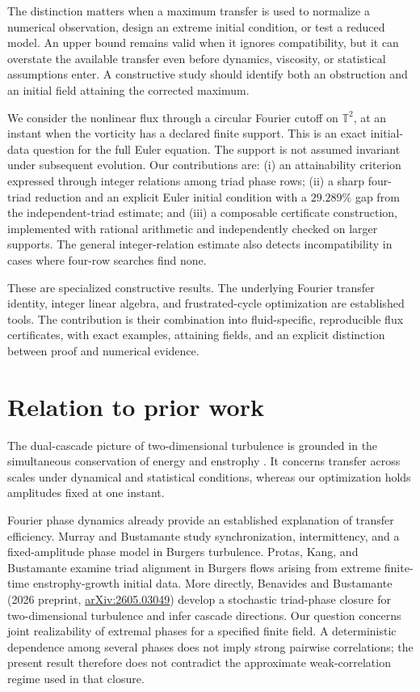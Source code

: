 \documentclass[11pt]{article}
\newcommand{\T}{\mathbb T}\newcommand{\Z}{\mathbb Z}\newcommand{\R}{\mathbb R}
\begin{document}
The distinction matters when a maximum transfer is used to normalize a numerical observation, design an extreme initial condition, or test a reduced model. An upper bound remains valid when it ignores compatibility, but it can overstate the available transfer even before dynamics, viscosity, or statistical assumptions enter. A constructive study should identify both an obstruction and an initial field attaining the corrected maximum.

We consider the nonlinear flux through a circular Fourier cutoff on $\T^2$, at an instant when the vorticity has a declared finite support. This is an exact initial-data question for the full Euler equation. The support is not assumed invariant under subsequent evolution. Our contributions are: (i) an attainability criterion expressed through integer relations among triad phase rows; (ii) a sharp four-triad reduction and an explicit Euler initial condition with a $29.289\%$ gap from the independent-triad estimate; and (iii) a composable certificate construction, implemented with rational arithmetic and independently checked on larger supports. The general integer-relation estimate also detects incompatibility in cases where four-row searches find none.

These are specialized constructive results. The underlying Fourier transfer identity, integer linear algebra, and frustrated-cycle optimization are established tools. The contribution is their combination into fluid-specific, reproducible flux certificates, with exact examples, attaining fields, and an explicit distinction between proof and numerical evidence.

\section{Relation to prior work}
The dual-cascade picture of two-dimensional turbulence is grounded in the simultaneous conservation of energy and enstrophy \cite{kraichnan}. It concerns transfer across scales under dynamical and statistical conditions, whereas our optimization holds amplitudes fixed at one instant.

Fourier phase dynamics already provide an established explanation of transfer efficiency. Murray and Bustamante \cite{murray} study synchronization, intermittency, and a fixed-amplitude phase model in Burgers turbulence. Protas, Kang, and Bustamante \cite{protas} examine triad alignment in Burgers flows arising from extreme finite-time enstrophy-growth initial data. More directly, Benavides and Bustamante (2026 preprint, \href{https://arxiv.org/abs/2605.03049}{arXiv:2605.03049}) develop a stochastic triad-phase closure for two-dimensional turbulence and infer cascade directions. Our question concerns joint realizability of extremal phases for a specified finite field. A deterministic dependence among several phases does not imply strong pairwise correlations; the present result therefore does not contradict the approximate weak-correlation regime used in that closure.
\end{document}
